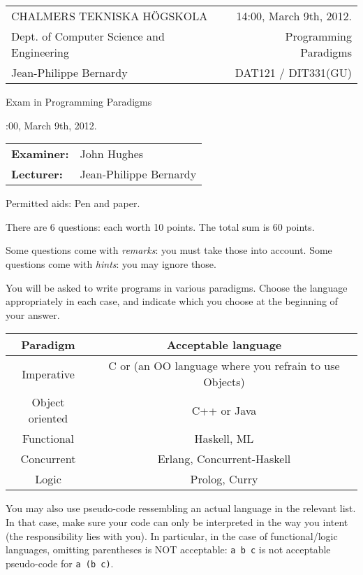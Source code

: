 \documentclass{article}
\begin{document}
\newcommand{\examtime}{14:00, March 9th, 2012}
\newcommand{\points}[1]{\marginpar{\bf #1 points}}
\noindent
\begin{tabular}{lr}
CHALMERS TEKNISKA H\"OGSKOLA &\examtime{}.\\
Dept. of Computer Science and Engineering & Programming Paradigms\\
Jean-Philippe Bernardy                 & DAT121 / DIT331(GU) \\
\end{tabular}

\vspace{2.5cm} \noindent
\begin{center} {\LARGE
Exam in Programming Paradigms}
\end{center}

\vspace{1.5cm}

\noindent
\examtime{}.\\
\begin{tabular}{ll}
\textbf{Examiner:} &  John Hughes  \\
\textbf{Lecturer:} & Jean-Philippe Bernardy
\end{tabular}
\vspace{1cm}

\noindent
Permitted aids: Pen and paper. 

There are 6 questions: each worth 10 points. The total sum is 60
points.  

Some questions come with \emph{remarks}: you must take those
into account.  Some questions come with \emph{hints}: you may ignore
those.

You will be asked to write programs in various paradigms. Choose the
language appropriately in each case, and indicate which you choose at
the beginning of your answer.

\begin{tabular}[p]{cc}
  Paradigm & Acceptable language \\ \hline
  Imperative   & C or (an OO language where you refrain to use Objects) \\
  Object oriented & C++ or Java \\
  Functional & Haskell, ML \\
  Concurrent & Erlang, Concurrent-Haskell \\
  Logic & Prolog, Curry 
\end{tabular}

You may also use pseudo-code ressembling an actual language in the
relevant list. In that case, make sure your code can only be
interpreted in the way you intent (the responsibility lies with
you). In particular, in the case of functional/logic languages,
omitting parentheses is NOT acceptable: \texttt{a b c} is not
acceptable pseudo-code for \texttt{a (b c)}.
\end{document}
